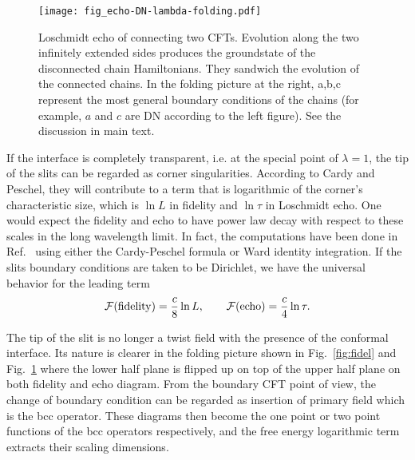 \begin{figure}[h]
\centering
\texttt{[image: fig\_echo-DN-lambda-folding.pdf]}
\caption{Loschmidt echo of connecting two CFTs. Evolution along the two infinitely extended sides produces the groundstate of the disconnected chain Hamiltonians. They sandwich the evolution of the connected chains. In the folding picture at the right, a,b,c represent the most general boundary conditions of the chains (for example, $a$ and $c$ are DN according to the left figure). See the discussion in main text.}
\label{fig:echo}
\end{figure}

If the interface is completely transparent, i.e. at the special point of $\lambda = 1$, the tip of the slits can be regarded as corner singularities. According to Cardy and Peschel\cite{cardy_finite-size_1988}, they will contribute to a term that is logarithmic of the corner's characteristic size, which is $\ln L$ in fidelity and $\ln \tau$ in Loschmidt echo. One would expect the fidelity and echo to have power law decay with respect to these scales in the long wavelength limit. In fact, the computations have been done in Ref.~ using either the Cardy-Peschel formula or Ward identity integration. If the slits boundary conditions are taken to be Dirichlet, we have the universal behavior for the leading term \cite{stephan_logarithmic_2013,stephan_local_2011}
\begin{equation}
\label{eq:full-pass}
\mathcal{F}({\rm fidelity}) =  \frac{c}{8} \ln L, \qquad \mathcal{F}( {\rm echo} )  = \frac{c}{4} \ln \tau .
\end{equation}

The tip of the slit is no longer a twist field with the presence of the conformal interface. Its nature is clearer in the folding picture shown in Fig.~\ref{fig:fidel} and Fig.~\ref{fig:echo} where the lower half plane is flipped up on top of the upper half plane on both fidelity and echo diagram. From the boundary CFT point of view, the change of boundary condition can be regarded as insertion of primary field which is the bcc operator. These diagrams then become the one point or two point functions of the bcc operators respectively, and the free energy logarithmic term extracts their scaling dimensions. 




